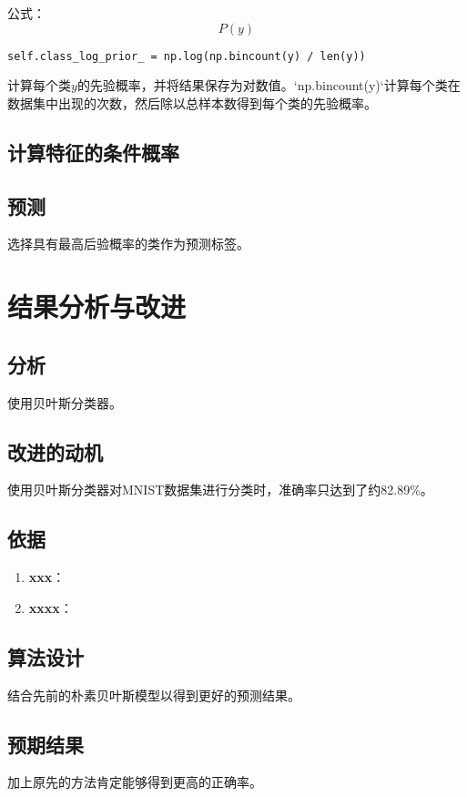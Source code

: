 \documentclass[12pt]{article}
\begin{document}
公式：
\[ P(y) \]

\begin{verbatim}
self.class_log_prior_ = np.log(np.bincount(y) / len(y))
\end{verbatim}
计算每个类$y$的先验概率，并将结果保存为对数值。`np.bincount(y)`计算每个类在数据集中出现的次数，然后除以总样本数得到每个类的先验概率。

\subsection{计算特征的条件概率}


\subsection{预测}



选择具有最高后验概率的类作为预测标签。

\section{结果分析与改进}

\subsection{分析}
使用贝叶斯分类器。

\subsection{改进的动机}

使用贝叶斯分类器对MNIST数据集进行分类时，准确率只达到了约82.89\%。

\subsection{依据}
\begin{enumerate}
    \item \textbf{xxx}：
    
    \item \textbf{xxxx}：
\end{enumerate}

\subsection{算法设计}
结合先前的朴素贝叶斯模型以得到更好的预测结果。

\subsection{预期结果}
加上原先的方法肯定能够得到更高的正确率。
\end{document}
